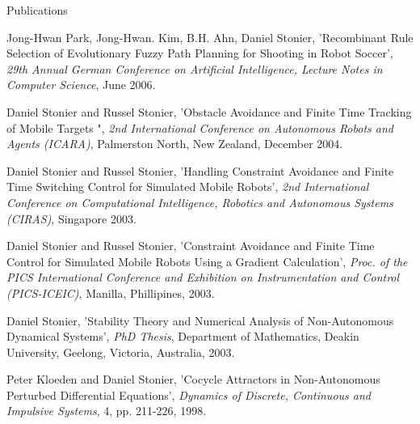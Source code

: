 \documentclass[a4paper,10pt]{article}
\begin{document}
\begin{cvsection}{Publications}
\begin{djs_itemize}
    \item Jong-Hwan Park, Jong-Hwan. Kim, B.H. Ahn, Daniel Stonier, 'Recombinant Rule Selection of Evolutionary Fuzzy Path Planning for Shooting in Robot Soccer', \textit{29th Annual German Conference on Artificial Intelligence, Lecture Notes in Computer Science}, June 2006.
    \item Daniel Stonier and Russel Stonier, 'Obstacle Avoidance and Finite Time Tracking of Mobile Targets ", \textit{2nd International Conference on Autonomous Robots and Agents (ICARA)}, Palmerston North, New Zealand, December 2004.
    \item Daniel Stonier and Russel Stonier, 'Handling Constraint Avoidance and Finite Time Switching Control for Simulated Mobile Robots', \textit{2nd International Conference on Computational Intelligence, Robotics and Autonomous Systems (CIRAS)}, Singapore 2003. 
    \item Daniel Stonier and Russel Stonier, 'Constraint Avoidance and Finite Time Control for Simulated Mobile Robots Using a Gradient Calculation', \textit{Proc. of the PICS International Conference and Exhibition on Instrumentation and Control (PICS-ICEIC)}, Manilla, Phillipines,  2003.
    \item Daniel Stonier, 'Stability Theory and Numerical Analysis of Non-Autonomous Dynamical Systems', \textit{PhD Thesis}, Department of Mathematics, Deakin University, Geelong, Victoria, Australia, 2003.
    \item Peter Kloeden and Daniel Stonier, 'Cocycle Attractors in Non-Autonomous Perturbed Differential Equations', \textit{Dynamics of Discrete, Continuous and Impulsive Systems}, 4, pp. 211-226, 1998.
  \end{djs_itemize}
\end{cvsection}

\newpage
\end{document}

